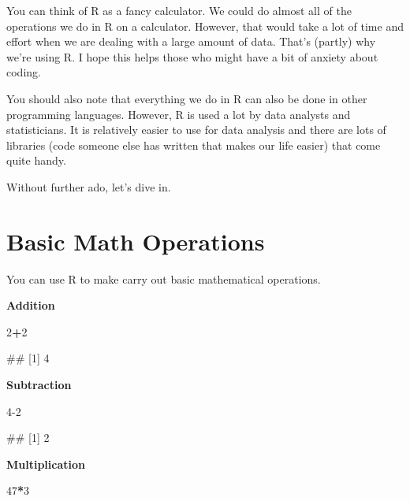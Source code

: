 \documentclass[
]{book}
\newenvironment{Shaded}{\begin{snugshade}}{\end{snugshade}}
\newcommand{\DecValTok}[1]{\textcolor[rgb]{0.00,0.00,0.81}{#1}}
\newcommand{\NormalTok}[1]{#1}
\newcommand{\SpecialCharTok}[1]{\textcolor[rgb]{0.81,0.36,0.00}{\textbf{#1}}}
\begin{document}
You can think of R as a fancy calculator. We could do almost all of the operations we do in R on a calculator. However, that would take a lot of time and effort when we are dealing with a large amount of data. That's (partly) why we're using R. I hope this helps those who might have a bit of anxiety about coding.

You should also note that everything we do in R can also be done in other programming languages. However, R is used a lot by data analysts and statisticians. It is relatively easier to use for data analysis and there are lots of libraries (code someone else has written that makes our life easier) that come quite handy.

Without further ado, let's dive in.

\section{Basic Math Operations}\label{basic-math-operations}

You can use R to make carry out basic mathematical operations.

\textbf{Addition}

\begin{Shaded}
\begin{Highlighting}[]
\DecValTok{2}\SpecialCharTok{+}\DecValTok{2}
\end{Highlighting}
\end{Shaded}

\begin{Shaded}
\begin{Highlighting}[]
\NormalTok{\#\# [1] 4}
\end{Highlighting}
\end{Shaded}

\textbf{Subtraction}

\begin{Shaded}
\begin{Highlighting}[]
\DecValTok{4{-}2}
\end{Highlighting}
\end{Shaded}

\begin{Shaded}
\begin{Highlighting}[]
\NormalTok{\#\# [1] 2}
\end{Highlighting}
\end{Shaded}

\textbf{Multiplication}

\begin{Shaded}
\begin{Highlighting}[]
\DecValTok{47}\SpecialCharTok{*}\DecValTok{3}
\end{Highlighting}
\end{Shaded}
\end{document}
